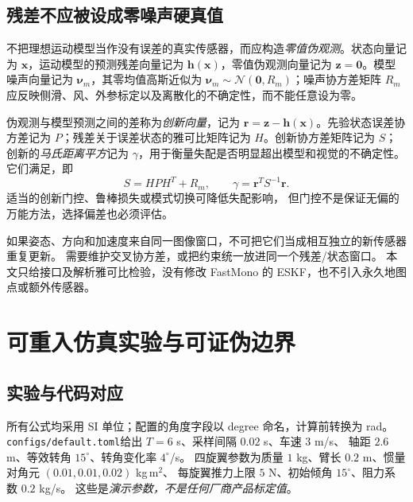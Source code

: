 \documentclass[UTF8,a4paper,fontset=fandol,11pt]{ctexart}
\newcommand{\vct}[1]{\bm #1}
\begin{document}
\subsection{残差不应被设成零噪声硬真值}
不把理想运动模型当作没有误差的真实传感器，而应构造\emph{零值伪观测}。状态向量记为 $\vct x$，运动模型的预测残差向量记为 $\vct h(\vct x)$，零值伪观测向量记为 $\vct z=\vct 0$。模型噪声向量记为 $\vct\nu_m$，其零均值高斯近似为 $\vct\nu_m\sim\mathcal N(\vct 0,R_m)$；噪声协方差矩阵 $R_m$ 应反映侧滑、风、外参标定以及离散化的不确定性，而不能任意设为零。

伪观测与模型预测之间的差称为\emph{创新向量}，记为 $\vct r=\vct z-\vct h(\vct x)$。先验状态误差协方差记为 $P$；残差关于误差状态的雅可比矩阵记为 $H$。创新协方差矩阵记为 $S$；创新的\emph{马氏距离平方}记为 $\gamma$，用于衡量失配是否明显超出模型和视觉的不确定性。它们满足，即
\begin{equation}
 S=HPH^T+R_m,\qquad \gamma=\vct r^T S^{-1}\vct r.
\end{equation}
适当的创新门控、鲁棒损失或模式切换可降低失配影响，
但门控不是保证无偏的万能方法，选择偏差也必须评估\cite{priors}。

如果姿态、方向和加速度来自同一图像窗口，不可把它们当成相互独立的新传感器重复更新。
需要维护交叉协方差，或把约束统一放进同一个残差/状态窗口。
本文只给接口及解析雅可比检验，没有修改 FastMono 的 ESKF，也不引入永久地图点或额外传感器。

\section{可重入仿真实验与可证伪边界}
\subsection{实验与代码对应}
所有公式均采用 SI 单位；配置的角度字段以 degree 命名，计算前转换为 rad。
\texttt{configs/default.toml}给出 $T=6$ s、采样间隔 $0.02$ s、车速 $3$ m/s、
轴距 $2.6$ m、等效转角 $15^\circ$、转角变化率 $4^\circ$/s。
四旋翼参数为质量 $1$ kg、臂长 $0.2$ m、惯量对角元 $(0.01,0.01,0.02)$ kg\,m$^2$、
每旋翼推力上限 $5$ N、初始倾角 $15^\circ$、阻力系数 $0.2$ kg/s。
这些是\emph{演示参数，不是任何厂商产品标定值}。
\end{document}
